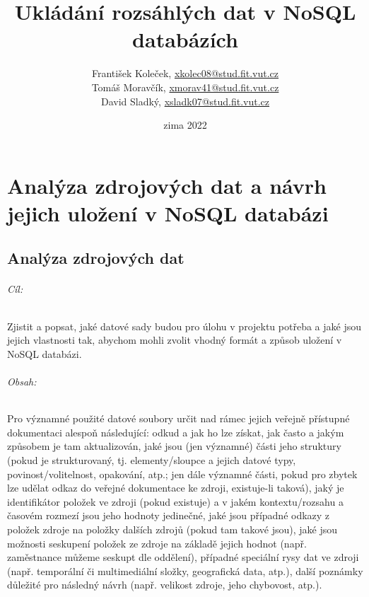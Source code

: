 \documentclass[10pt,xcolor=pdflatex,dvipsnames,table,oneside]{book}
\author{
    František Koleček, \href{mailto:xkolec08@stud.fit.vut.cz}{xkolec08@stud.fit.vut.cz} \\
    Tomáš Moravčík, \href{mailto:xmorav41@stud.fit.vut.cz}{xmorav41@stud.fit.vut.cz} \\
    David Sladký, \href{mailto:xsladk07@stud.fit.vut.cz}{xsladk07@stud.fit.vut.cz}
    }
\title{Ukládání rozsáhlých dat v NoSQL databázích}
\date{zima 2022}
\begin{document}

\hypersetup{pageanchor=false}%
\maketitle
\hypersetup{pageanchor=true}

\tableofcontents

\newpage%

\part{Analýza zdrojových dat a návrh jejich uložení v NoSQL databázi}

\chapter{Analýza zdrojových dat}

\paragraph{Cíl:}
Zjistit a popsat, jaké datové sady budou pro úlohu v projektu potřeba a jaké jsou jejich vlastnosti tak,
abychom mohli zvolit vhodný formát a způsob uložení v NoSQL databázi.

\paragraph{Obsah:}
Pro významné použité datové soubory určit nad rámec jejich veřejně přístupné dokumentaci alespoň následující:
odkud a jak ho lze získat,
jak často a jakým způsobem je tam aktualizován,
jaké jsou (jen významné) části jeho struktury (pokud je strukturovaný, tj. elementy/sloupce a jejich datové typy, povinost/volitelnost, opakování, atp.;
jen dále významné části, pokud pro zbytek lze udělat odkaz do veřejné dokumentace ke zdroji, existuje-li taková),
jaký je identifikátor položek ve zdroji (pokud existuje) a v jakém kontextu/rozsahu a časovém rozmezí jsou jeho hodnoty jedinečné,
jaké jsou případné odkazy z položek zdroje na položky dalších zdrojů (pokud tam takové jsou),
jaké jsou možnosti seskupení položek ze zdroje na základě jejich hodnot (např. zaměstnance můžeme seskupt dle oddělení),
případné speciální rysy dat ve zdroji (např. temporální či multimediální složky, geografická data, atp.),
další poznámky důležité pro následný návrh (např. velikost zdroje, jeho chybovost, atp.).
\end{document}
